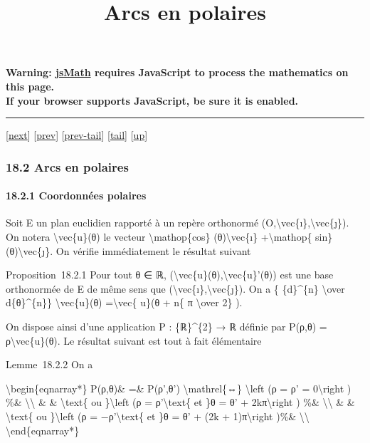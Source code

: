\documentclass[]{article}
\title{Arcs en polaires}
\author{}
\date{}
\begin{document}
\maketitle

\textbf{Warning: \href{http://www.math.union.edu/locate/jsMath}{jsMath}
requires JavaScript to process the mathematics on this page.\\ If your
browser supports JavaScript, be sure it is enabled.}

\begin{center}\rule{3in}{0.4pt}\end{center}

{[}\href{coursse98.html}{next}{]} {[}\href{coursse96.html}{prev}{]}
{[}\href{coursse96.html\#tailcoursse96.html}{prev-tail}{]}
{[}\hyperref[tailcoursse97.html]{tail}{]}
{[}\href{coursch19.html\#coursse97.html}{up}{]}

\subsubsection{18.2 Arcs en polaires}

\paragraph{18.2.1 Coordonnées polaires}

Soit E un plan euclidien rapporté à un repère orthonormé
(O,\textbackslash{}vec\{ı\},\textbackslash{}vec\{ȷ\}). On notera
\textbackslash{}vec\{u\}(θ) le vecteur \textbackslash{}mathop\{cos\}
(θ)\textbackslash{}vec\{ı\} +\textbackslash{}mathop\{ sin\}
(θ)\textbackslash{}vec\{ȷ\}. On vérifie immédiatement le résultat
suivant

Proposition~18.2.1 Pour tout θ ∈ ℝ,
(\textbackslash{}vec\{u\}(θ),\textbackslash{}vec\{u\}'(θ)) est une base
orthonormée de E de même sens que
(\textbackslash{}vec\{ı\},\textbackslash{}vec\{ȷ\}). On a \{
\{d\}\^{}\{n\} \textbackslash{}over d\{θ\}\^{}\{n\}\}
\textbackslash{}vec\{u\}(θ) =\textbackslash{}vec\{ u\}(θ + n\{ π
\textbackslash{}over 2\} ).

On dispose ainsi d'une application P : \{ℝ\}\^{}\{2\} → ℝ définie par
P(ρ,θ) = ρ\textbackslash{}vec\{u\}(θ). Le résultat suivant est tout à
fait élémentaire

Lemme~18.2.2 On a

\textbackslash{}begin\{eqnarray*\} P(ρ,θ)\& =\& P(ρ',θ')
\textbackslash{}mathrel\{⇔\} \textbackslash{}left (ρ = ρ' =
0\textbackslash{}right ) \%\& \textbackslash{}\textbackslash{} \& \&
\textbackslash{}text\{ ou \}\textbackslash{}left (ρ =
ρ'\textbackslash{}text\{ et \}θ = θ' + 2kπ\textbackslash{}right ) \%\&
\textbackslash{}\textbackslash{} \& \& \textbackslash{}text\{ ou
\}\textbackslash{}left (ρ = −ρ'\textbackslash{}text\{ et \}θ = θ' + (2k
+ 1)π\textbackslash{}right )\%\& \textbackslash{}\textbackslash{}
\textbackslash{}end\{eqnarray*\}
\end{document}
